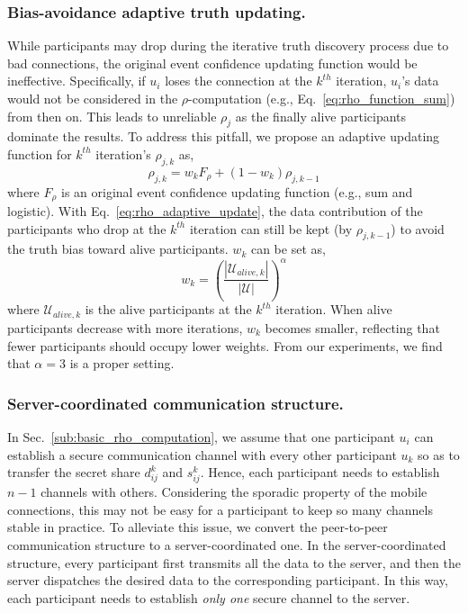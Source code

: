 \subsubsection{Bias-avoidance adaptive truth updating.}
\label{sub:adaptive_truth_updating} 
While participants may drop during the iterative truth discovery process due to bad connections, the original event confidence updating function would be ineffective. Specifically, if $u_i$ loses the connection at the $k^{th}$ iteration, $u_i$'s data would not be considered in the $\rho$-computation (e.g., Eq.~\ref{eq:rho_function_sum}) from then on. This leads to unreliable $\rho_j$ as the finally alive participants dominate the results. To address this pitfall, we propose an adaptive updating function for $k^{th}$ iteration's $\rho_{j,k}$ as,
\begin{equation}
	\rho_{j,k} = w_k F_\rho + (1-w_k) \rho_{j,k-1}
	\label{eq:rho_adaptive_update}
\end{equation}
where $F_\rho$ is an original event confidence updating function (e.g., sum and logistic). With Eq.~\ref{eq:rho_adaptive_update}, the data contribution of the participants who drop at the $k^{th}$ iteration can still be kept (by $\rho_{j,k-1}$) to avoid the truth bias toward alive participants. $w_k$ can be set as,
\begin{equation}
	w_k = (\frac{|\mathcal U_{alive,k}|}{|\mathcal U|})^\alpha
	\label{eq:adaptive_weight}
\end{equation}
where $\mathcal U_{alive,k}$ is the alive participants at the $k^{th}$ iteration. When alive participants decrease with more iterations, $w_k$ becomes smaller, reflecting that fewer participants should occupy lower weights. From our experiments, we find that $\alpha=3$ is a proper setting.

\subsubsection{Server-coordinated communication structure.} 
\label{subsub:server_coordination}

In Sec.~\ref{sub:basic_rho_computation}, we assume that one participant $u_i$ can establish a secure communication channel with every other participant $u_k$ so as to transfer the secret share $d_{ij}^k$ and $s_{ij}^k$. Hence, each participant needs to establish $n-1$ channels with others. Considering the sporadic property of the mobile connections, this may not be easy for a participant to keep so many channels stable in practice. To alleviate this issue, we convert the peer-to-peer communication structure to a server-coordinated one. In the server-coordinated structure, every participant first transmits all the data to the server, and then the server dispatches the desired data to the corresponding participant. In this way, each participant  needs to establish \textit{only one} secure channel to the server.

